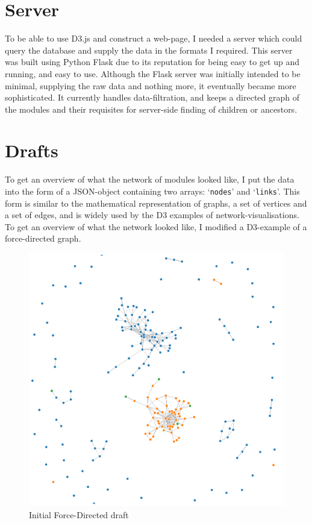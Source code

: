 \section{Server}
To be able to use D3.js and construct a web-page, I needed a server which could
query the database and supply the data in the formats I required. This server
was built using Python Flask due to its reputation for being easy to get up and
running, and easy to use. Although the Flask server was initially intended to be
minimal, supplying the raw data and nothing more, it eventually became more
sophisticated. It currently handles data-filtration, and keeps a directed graph
of the modules and their requisites for server-side finding of children or
ancestors.

\section{Drafts}
To get an overview of what the network of modules looked like, I put the data
into the form of a JSON-object containing two arrays: `\texttt{nodes}' and
`\texttt{links}'. This form is similar to the mathematical representation of
graphs, a set of vertices and a set of edges, and is widely used by the D3
examples of network-visualisations.
\\

To get an overview of what the network looked like, I modified a D3-example of a
force-directed graph.
\begin{figure}
    \centering
    \includegraphics[width=\linewidth]{../Visualisation/screenshots/draft-fd-graph.png}
    \caption{Initial Force-Directed draft}
\end{figure}


